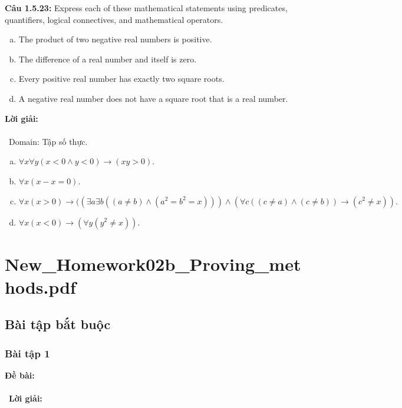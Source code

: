 \documentclass[a4paper]{article}
\begin{document}
\textbf{Câu 1.5.23: }Express each of these mathematical statements using predicates, quantifiers, logical connectives, and mathematical operators.
\begin{enumerate}[a)]
\item The product of two negative real numbers is positive.
\item The difference of a real number and itself is zero.
\item Every positive real number has exactly two square
roots.
\item A negative real number does not have a square root
that is a real number.
\end{enumerate}
\textbf{Lời giải: } \\\ \\\
Domain: Tập số thực.
\begin{enumerate}[a)]
\item $\forall x \forall y(x < 0 \land y < 0) \rightarrow (xy > 0).$
\item $\forall x(x - x = 0).$
\item $\forall x (x>0)\rightarrow ((\exists a \exists b ((a \neq b) \land (a^2 = b^2 = x))) \land (\forall c ((c \neq a) \land (c \neq b))\rightarrow(c^2 \neq x)).$
\item $\forall x (x < 0) \rightarrow (\forall y (y^2 \neq x)).$
\end{enumerate}

\clearpage

\section{New\_Homework02b\_Proving\_methods.pdf}
\subsection{Bài tập bắt buộc}
\subsubsection{Bài tập 1}
\textbf{Đề bài:} 
\\\ \\\
\textbf{Lời giải:} \\\ \\\
\clearpage
\end{document}
